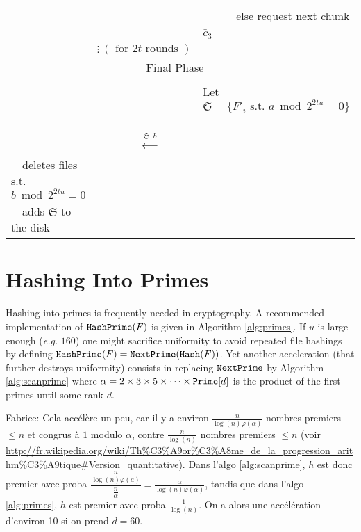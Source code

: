 \documentclass[11pt]{llncs}
\newcommand{\comm}[1]{\marginpar{%
\vskip-\baselineskip %
\raggedright\footnotesize
\itshape\hrule\smallskip#1\par\smallskip\hrule}}
\begin{document}
\begin{center}
\begin{tabular}{|lcl|}
                                   &                                                      &~~~~~~else request next chunk $\bar{c}_3$~~\\
                                   &                  $\vdots~(\mbox{~for~}2t \mbox{~rounds~})$    & \\\hline\hline
\multicolumn{3}{|c|}{{\sf Final Phase~~}} \\\hline
                                   &                                                      & \\
                                   &                                                      &Let $\mathfrak{S}=\{F'_i \mbox{~s.t.~} a \bmod 2^{2tu} =0\}$~~\\
                                   &~~{\LARGE $\stackrel{\mathfrak{S},b}{\longleftarrow}$}&\\
                                   ~~deletes files s.t. $b \bmod 2^{2t u} =0$&        &\\
                                   ~~adds $\mathfrak{S}$ to the disk    &                                                      &\\\hline
\end{tabular}
\end{center}

\section{Hashing Into Primes}
\label{sec:hashprime}
Hashing into primes is frequently needed in cryptography. A recommended implementation of $\mbox{{\tt HashPrime}}(F)$ is given in Algorithm \ref{alg:primes}. If $u$ is large enough ({\sl e.g.} $160$) one might sacrifice uniformity to avoid repeated file hashings by defining $\mbox{{\tt HashPrime}}(F)=\mbox{{\tt NextPrime}}(\mbox{{\tt Hash}}(F))$. 
Yet another acceleration (that further destroys uniformity) consists in replacing $\mbox{{\tt NextPrime}}$ by Algorithm \ref{alg:scanprime} where $\alpha=2\times 3\times 5\times \cdots \times \mbox{{\tt Prime}}[d]$ is the product of the first primes until some rank $d$.
\comm{analyse ci-contre}

Fabrice: Cela accélère un peu, car il y a environ $\frac{n}{\log(n) \varphi(\alpha)}$ nombres premiers $\le n$ et congrus à $1$ modulo $\alpha$, contre $\frac{n}{\log(n)}$ nombres premiers $\le n$ (voir \url{http://fr.wikipedia.org/wiki/Th%C3%A9or%C3%A8me_de_la_progression_arithm%C3%A9tique#Version_quantitative}).
Dans l'algo \ref{alg:scanprime}, $h$ est donc premier avec proba $\dfrac{\frac{n}{\log(n) \varphi(a)}}{\frac{n}{\alpha}} = \frac{\alpha}{\log(n) \varphi(\alpha)}$, tandis que dans l'algo \ref{alg:primes}, $h$ est premier avec proba $\frac{1}{\log(n)}$.
On a alors une accélération d'environ 10 si on prend $d=60$.
\end{document}
